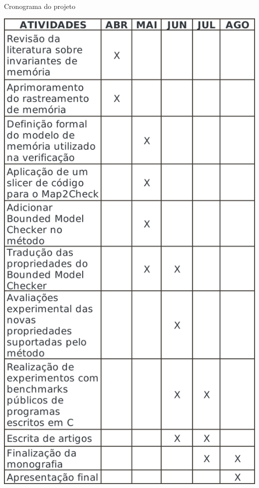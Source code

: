 \begin{table}[H]
	\caption{\label{fig:crono} Cronograma do projeto}
	\begin{center}
	    \includegraphics[scale=0.75]{resources/crono.png}
	\end{center}
\end{table}

\newpage